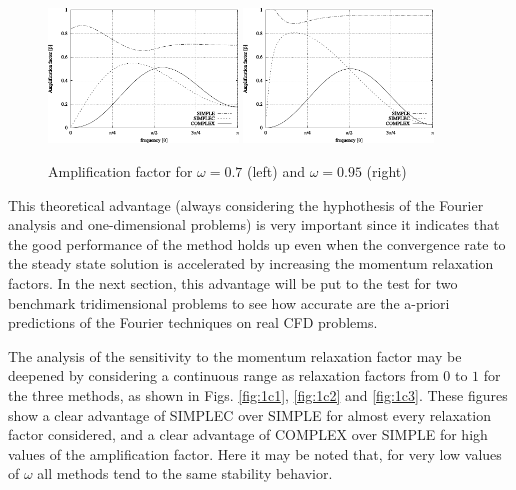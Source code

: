 \documentclass[final,3p,times,11pt,onecolumn]{myElsarticle}
\numberwithin{equation}{section}
\begin{document}
\begin{figure}[H]
    \centering
    \includegraphics[width=0.45\textwidth]{fig/w07} \hspace{1cm}
    \includegraphics[width=0.45\textwidth]{fig/w095}
    \caption{Amplification factor for $\omega=0.7$ (left) and $\omega=0.95$ (right)}
    \label{fig:1b}
\end{figure}    

This theoretical advantage (always considering the hyphothesis of the Fourier analysis and one-dimensional problems) is very important since it indicates that the good performance of the method holds up even when the convergence rate to the steady state solution is accelerated by increasing the momentum relaxation factors. In the next section, this advantage will be put to the test for two benchmark tridimensional problems to see how accurate are the a-priori predictions of the Fourier techniques on real CFD problems.

The analysis of the sensitivity to the momentum relaxation factor may be deepened by considering a continuous range as relaxation factors from $0$ to $1$ for the three methods, as shown in Figs. \ref{fig:1c1}, \ref{fig:1c2} and \ref{fig:1c3}. These figures show a clear advantage of SIMPLEC over SIMPLE for almost every relaxation factor considered, and a clear advantage of COMPLEX over SIMPLE for high values of the amplification factor. Here it may be noted that, for very low values of $\omega$ all methods tend to the same stability behavior.
\end{document}
